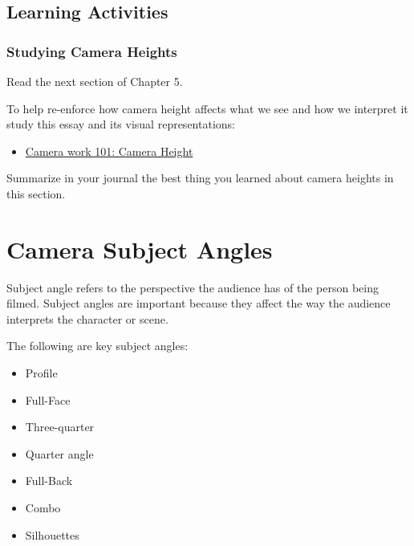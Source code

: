 \documentclass[
]{book}
\providecommand{\tightlist}{%
  \setlength{\itemsep}{0pt}\setlength{\parskip}{0pt}}
\begin{document}
\hypertarget{learning-activities-16}{%
\subsection*{Learning Activities}\label{learning-activities-16}}

\begin{reflect}
\hypertarget{studying-camera-heights}{%
\subsubsection*{Studying Camera Heights}\label{studying-camera-heights}}

Read the next section of Chapter 5.

To help re-enforce how camera height affects what we see and how we interpret it study this essay and its visual representations:

\begin{itemize}
\tightlist
\item
  \href{http://timurcivan.com/2015/02/camera-work-101-camera-height/}{Camera work 101: Camera Height}
\end{itemize}

Summarize in your journal the best thing you learned about camera heights in this section.
\end{reflect}

\hypertarget{camera-subject-angles}{%
\section{Camera Subject Angles}\label{camera-subject-angles}}

Subject angle refers to the perspective the audience has of the person being filmed. Subject angles are important because they affect the way the audience interprets the character or scene.

The following are key subject angles:

\begin{itemize}
\tightlist
\item
  Profile\\
\item
  Full-Face\\
\item
  Three-quarter\\
\item
  Quarter angle\\
\item
  Full-Back\\
\item
  Combo\\
\item
  Silhouettes
\end{itemize}
\end{document}
